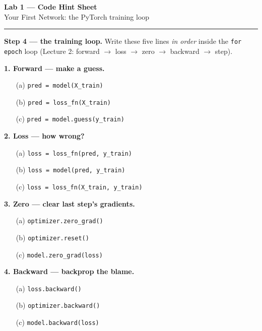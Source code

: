 \documentclass[11pt]{article}
\newcommand{\opt}[1]{\texttt{#1}}
\begin{document}
\small

\begin{center}
{\Large \textbf{Lab 1 --- Code Hint Sheet}}\\[2pt]
{\normalsize Your First Network: the PyTorch training loop}
\end{center}

\vspace{-2pt}
\begin{center}
\end{center}

\vspace{2pt}\hrule\vspace{4pt}

\textbf{Step 4 --- the training loop.}\; {\small Write these five lines \emph{in order} inside the
\texttt{for epoch} loop (Lecture 2: forward $\to$ loss $\to$ zero $\to$ backward $\to$ step).}

\textbf{1. Forward --- make a guess.}
\begin{itemize}
  \item[(a)] \opt{pred = model(X\_train)}
  \item[(b)] \opt{pred = loss\_fn(X\_train)}
  \item[(c)] \opt{pred = model.guess(y\_train)}
\end{itemize}

\textbf{2. Loss --- how wrong?}
\begin{itemize}
  \item[(a)] \opt{loss = loss\_fn(pred, y\_train)}
  \item[(b)] \opt{loss = model(pred, y\_train)}
  \item[(c)] \opt{loss = loss\_fn(X\_train, y\_train)}
\end{itemize}

\textbf{3. Zero --- clear last step's gradients.}
\begin{itemize}
  \item[(a)] \opt{optimizer.zero\_grad()}
  \item[(b)] \opt{optimizer.reset()}
  \item[(c)] \opt{model.zero\_grad(loss)}
\end{itemize}

\textbf{4. Backward --- backprop the blame.}
\begin{itemize}
  \item[(a)] \opt{loss.backward()}
  \item[(b)] \opt{optimizer.backward()}
  \item[(c)] \opt{model.backward(loss)}
\end{itemize}
\end{document}
